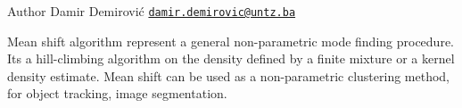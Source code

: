 \begin{DoxyAuthor}{Author}
Damir Demirović \href{mailto:damir.demirovic@untz.ba}{\tt damir.\+demirovic@untz.\+ba}
\end{DoxyAuthor}
Mean shift algorithm represent a general non-\/parametric mode finding procedure. It\textquotesingle{}s a hill-\/climbing algorithm on the density defined by a finite mixture or a kernel density estimate. Mean shift can be used as a non-\/parametric clustering method, for object tracking, image segmentation. 